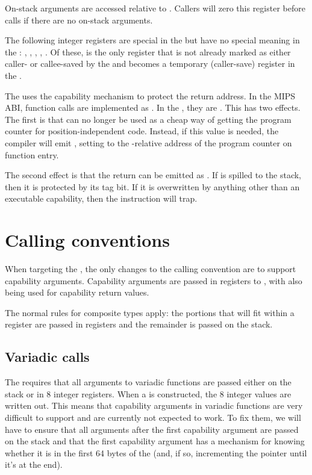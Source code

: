 On-stack arguments are accessed relative to .
Callers will zero this register before calls if there are no on-stack arguments.

The following integer registers are special in the \mipsABI{} but have no special meaning in the \sandboxABI{}:
, , , , .
Of these,  is the only register that is not already marked as either caller- or callee-saved by the \mipsABI{} and becomes a temporary (caller-save) register in the \sandboxABI{}.

The \sandboxABI{} uses the capability mechanism to protect the return address.
In the MIPS ABI, function calls are implemented as .
In the \sandboxABI{}, they are .
This has two effects.
The first is that  can no longer be used as a cheap way of getting the program counter for position-independent code.
Instead, if this value is needed, the compiler will emit , setting  to the -relative address of the program counter on function entry.

The second effect is that the return can be emitted as .%
If  is spilled to the stack, then it is protected by its tag bit.
If it is overwritten by anything other than an executable capability, then the  instruction will trap.

\section{Calling conventions}

When targeting the \mipsABI{}, the only changes to the calling convention are to support capability arguments.
Capability arguments are passed in registers  to , with  also being used for capability return values.

The normal rules for composite types apply: the portions that will fit within a register are passed in registers and the remainder is passed on the stack.

\subsection{Variadic calls}

The \mipsABI{} requires that all arguments to variadic functions are passed either on the stack or in 8 integer registers.
When a  is constructed, the 8 integer values are written out.
This means that capability arguments in variadic functions are very difficult to support and are currently not expected to work.
To fix them, we will have to ensure that all arguments after the first capability argument are passed on the stack and that the first capability argument has a mechanism for knowing whether it is in the first 64 bytes of the  (and, if so, incrementing the pointer until it's at the end).

